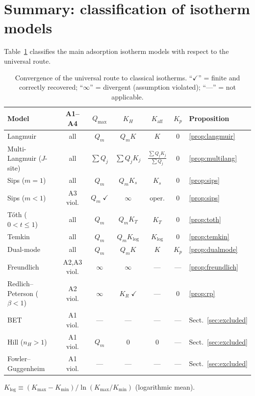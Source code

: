 \documentclass[12pt]{article}
\begin{document}
\section{Summary: classification of isotherm models}
\label{sec:summary}

Table~\ref{tab:summary} classifies the main adsorption isotherm
models with respect to the universal route.

\begin{table}[htbp]
\centering
\caption{Convergence of the universal route to classical isotherms.
``$\checkmark$'' = finite and correctly recovered;
``$\infty$'' = divergent (assumption violated);
``---'' = not applicable.}
\label{tab:summary}
\small
\begin{tabular}{@{}lcccccl@{}}
\toprule
\textbf{Model} & \textbf{A1--A4} & $Q_{\max}$ & $K_H$
  & $K_{\mathrm{aff}}$ & $K_p$ & \textbf{Proposition} \\
\midrule
Langmuir
  & all & $Q_m$ & $Q_m K$ & $K$
  & $0$ & \ref{prop:langmuir} \\[2pt]
Multi-Langmuir ($J$-site)
  & all & $\sum Q_j$ & $\sum Q_j K_j$
  & $\frac{\sum Q_j K_j}{\sum Q_j}$
  & $0$ & \ref{prop:multilang} \\[2pt]
Sips ($m=1$)
  & all & $Q_m$ & $Q_m K_s$ & $K_s$
  & $0$ & \ref{prop:sips} \\[2pt]
Sips ($m<1$)
  & A3 viol. & $Q_m\;\checkmark$ & $\infty$
  & oper. & $0$ & \ref{prop:sips} \\[2pt]
T\'oth ($0<t\le 1$)
  & all & $Q_m$ & $Q_m K_T$ & $K_T$
  & $0$ & \ref{prop:toth} \\[2pt]
Temkin
  & all & $Q_m$ & $Q_m K_{\log}$
  & $K_{\log}$ & $0$ & \ref{prop:temkin} \\[2pt]
Dual-mode
  & all & $Q_m$ & $Q_m K$ & $K$
  & $K_p$ & \ref{prop:dualmode} \\[2pt]
Freundlich
  & A2,A3 viol. & $\infty$ & $\infty$
  & --- & --- & \ref{prop:freundlich} \\[2pt]
Redlich--Peterson ($\beta<1$)
  & A2 viol. & $\infty$ & $K_R\;\checkmark$
  & --- & $0$ & \ref{prop:rp} \\[2pt]
\midrule
BET & A1 viol. & --- & --- & --- & ---
  & Sect.~\ref{sec:excluded} \\
Hill ($n_H>1$)
  & A1 viol. & $Q_m$ & $0$ & $0$
  & --- & Sect.~\ref{sec:excluded} \\
Fowler--Guggenheim
  & A1 viol. & --- & --- & --- & ---
  & Sect.~\ref{sec:excluded} \\
\bottomrule
\end{tabular}

\medskip
$K_{\log}\equiv(K_{\max}-K_{\min})/\ln(K_{\max}/K_{\min})$
\quad (logarithmic mean).
\end{table}
\end{document}
